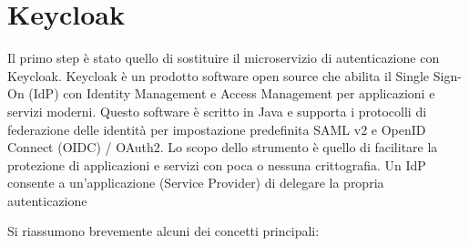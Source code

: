 \documentclass{article}
\begin{document}
\section{Keycloak}


Il primo step è stato quello di sostituire il microservizio di autenticazione con Keycloak. Keycloak è un
prodotto software open source che abilita il Single Sign-On (IdP) con Identity Management e
Access Management per applicazioni e servizi moderni. Questo software è scritto in Java e
supporta i protocolli di federazione delle identità per impostazione predefinita SAML v2 e
OpenID Connect (OIDC) / OAuth2. Lo scopo dello strumento è quello di facilitare la protezione
di applicazioni e servizi con poca o nessuna crittografia. Un IdP consente a un'applicazione
(Service Provider) di delegare la propria autenticazione %

Si riassumono brevemente alcuni dei concetti principali:
\end{document}

